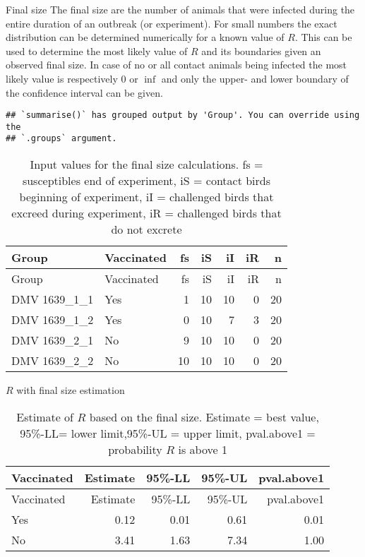\documentclass[
  ignorenonframetext,
]{beamer}
\begin{document}
\begin{frame}[fragile]{Final size}
\protect\hypertarget{final-size}{}
The final size are the number of animals that were infected during the
entire duration of an outbreak (or experiment). For small numbers the
exact distribution can be determined numerically for a known value of
\(R\). This can be used to determine the most likely value of \(R\) and
its boundaries given an observed final size. In case of no or all
contact animals being infected the most likely value is respectively 0
or \(\inf\) and only the upper- and lower boundary of the confidence
interval can be given.

\begin{verbatim}
## `summarise()` has grouped output by 'Group'. You can override using the
## `.groups` argument.
\end{verbatim}

\begin{longtable}[]{@{}llrrrrr@{}}
\caption{Input values for the final size calculations. fs = susceptibles
end of experiment, iS = contact birds beginning of experiment, iI =
challenged birds that excreed during experiment, iR = challenged birds
that do not excrete}\tabularnewline
\toprule
Group & Vaccinated & fs & iS & iI & iR & n \\
\midrule
\endfirsthead
\toprule
Group & Vaccinated & fs & iS & iI & iR & n \\
\midrule
\endhead
DMV 1639\_1\_1 & Yes & 1 & 10 & 10 & 0 & 20 \\
DMV 1639\_1\_2 & Yes & 0 & 10 & 7 & 3 & 20 \\
DMV 1639\_2\_1 & No & 9 & 10 & 10 & 0 & 20 \\
DMV 1639\_2\_2 & No & 10 & 10 & 10 & 0 & 20 \\
\bottomrule
\end{longtable}

\begin{block}{\(R\) with final size estimation}
\protect\hypertarget{r-with-final-size-estimation}{}
\begin{longtable}[]{@{}lrrrr@{}}
\caption{Estimate of \(R\) based on the final size. Estimate = best
value, 95\%-LL= lower limit,95\%-UL = upper limit, pval.above1 =
probability \(R\) is above 1}\tabularnewline
\toprule
Vaccinated & Estimate & 95\%-LL & 95\%-UL & pval.above1 \\
\midrule
\endfirsthead
\toprule
Vaccinated & Estimate & 95\%-LL & 95\%-UL & pval.above1 \\
\midrule
\endhead
Yes & 0.12 & 0.01 & 0.61 & 0.01 \\
No & 3.41 & 1.63 & 7.34 & 1.00 \\
\bottomrule
\end{longtable}
\end{block}


\end{frame}
\end{document}
